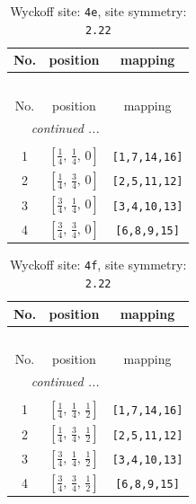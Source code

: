 \documentclass[fleqn,8pt]{jsarticle}
\begin{document}
\begin{longtable}{ccc}
\caption{Wyckoff site: {\tt 4e}, site symmetry: {\tt 2.22}}
 \\
 \hline \hline
No. & position & mapping \\ \hline \endfirsthead

\multicolumn{2}{l}{\tablename\ \thetable{}} \\
 \hline \hline
No. & position & mapping \\ \hline \endhead

 \hline \hline
\multicolumn{2}{r}{\footnotesize\it continued ...} \\ \endfoot

 \hline \hline
\multicolumn{2}{r}{} \\ \endlastfoot

1 & $\left[ \frac{1}{4},\, \frac{1}{4},\, 0 \right]$ & {\tt [1,7,14,16]} \\ \hline
2 & $\left[ \frac{1}{4},\, \frac{3}{4},\, 0 \right]$ & {\tt [2,5,11,12]} \\ \hline
3 & $\left[ \frac{3}{4},\, \frac{1}{4},\, 0 \right]$ & {\tt [3,4,10,13]} \\ \hline
4 & $\left[ \frac{3}{4},\, \frac{3}{4},\, 0 \right]$ & {\tt [6,8,9,15]} \\
\end{longtable}
\renewcommand{\arraystretch}{1.2}
\begin{longtable}{ccc}
\caption{Wyckoff site: {\tt 4f}, site symmetry: {\tt 2.22}}
 \\
 \hline \hline
No. & position & mapping \\ \hline \endfirsthead

\multicolumn{2}{l}{\tablename\ \thetable{}} \\
 \hline \hline
No. & position & mapping \\ \hline \endhead

 \hline \hline
\multicolumn{2}{r}{\footnotesize\it continued ...} \\ \endfoot

 \hline \hline
\multicolumn{2}{r}{} \\ \endlastfoot

1 & $\left[ \frac{1}{4},\, \frac{1}{4},\, \frac{1}{2} \right]$ & {\tt [1,7,14,16]} \\ \hline
2 & $\left[ \frac{1}{4},\, \frac{3}{4},\, \frac{1}{2} \right]$ & {\tt [2,5,11,12]} \\ \hline
3 & $\left[ \frac{3}{4},\, \frac{1}{4},\, \frac{1}{2} \right]$ & {\tt [3,4,10,13]} \\ \hline
4 & $\left[ \frac{3}{4},\, \frac{3}{4},\, \frac{1}{2} \right]$ & {\tt [6,8,9,15]} \\
\end{longtable}
\end{document}
